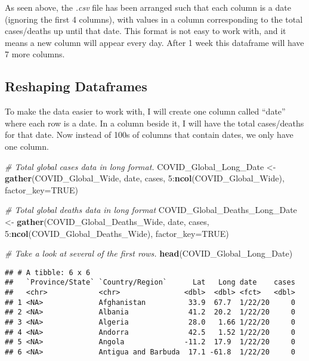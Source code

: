 \documentclass[]{tufte-handout}
\newenvironment{Shaded}{}{}
\newcommand{\CommentTok}[1]{\textcolor[rgb]{0.38,0.63,0.69}{\textit{#1}}}
\newcommand{\DataTypeTok}[1]{\textcolor[rgb]{0.56,0.13,0.00}{#1}}
\newcommand{\DecValTok}[1]{\textcolor[rgb]{0.25,0.63,0.44}{#1}}
\newcommand{\KeywordTok}[1]{\textcolor[rgb]{0.00,0.44,0.13}{\textbf{#1}}}
\newcommand{\NormalTok}[1]{#1}
\newcommand{\OperatorTok}[1]{\textcolor[rgb]{0.40,0.40,0.40}{#1}}
\newcommand{\OtherTok}[1]{\textcolor[rgb]{0.00,0.44,0.13}{#1}}
\newcommand{\StringTok}[1]{\textcolor[rgb]{0.25,0.44,0.63}{#1}}
\begin{document}
As seen above, the \emph{.csv} file has been arranged such that each
column is a date (ignoring the first 4 columns), with values in a column
corresponding to the total cases/deaths up until that date. This format
is not easy to work with, and it means a new column will appear every
day. After 1 week this dataframe will have 7 more columns.

\hypertarget{reshaping-dataframes}{%
\subsection{Reshaping Dataframes}\label{reshaping-dataframes}}

To make the data easier to work with, I will create one column called
``date'' where each row is a date. In a column beside it, I will have
the total cases/deaths for that date. Now instead of 100s of columns
that contain dates, we only have one column.

\begin{Shaded}
\begin{Highlighting}[]
\CommentTok{# Total global cases data in long format.}
\NormalTok{COVID_Global_Long_Date <-}\StringTok{ }\KeywordTok{gather}\NormalTok{(COVID_Global_Wide, date, cases, }\DecValTok{5}\OperatorTok{:}\KeywordTok{ncol}\NormalTok{(COVID_Global_Wide), }\DataTypeTok{factor_key=}\OtherTok{TRUE}\NormalTok{)}

\CommentTok{# Total global deaths data in long format}
\NormalTok{COVID_Global_Deaths_Long_Date <-}\StringTok{ }\KeywordTok{gather}\NormalTok{(COVID_Global_Deaths_Wide, date, cases, }\DecValTok{5}\OperatorTok{:}\KeywordTok{ncol}\NormalTok{(COVID_Global_Deaths_Wide), }\DataTypeTok{factor_key=}\OtherTok{TRUE}\NormalTok{)}

\CommentTok{# Take a look at several of the first rows.}
\KeywordTok{head}\NormalTok{(COVID_Global_Long_Date)}
\end{Highlighting}
\end{Shaded}

\begin{verbatim}
## # A tibble: 6 x 6
##   `Province/State` `Country/Region`      Lat   Long date    cases
##   <chr>            <chr>               <dbl>  <dbl> <fct>   <dbl>
## 1 <NA>             Afghanistan          33.9  67.7  1/22/20     0
## 2 <NA>             Albania              41.2  20.2  1/22/20     0
## 3 <NA>             Algeria              28.0   1.66 1/22/20     0
## 4 <NA>             Andorra              42.5   1.52 1/22/20     0
## 5 <NA>             Angola              -11.2  17.9  1/22/20     0
## 6 <NA>             Antigua and Barbuda  17.1 -61.8  1/22/20     0
\end{verbatim}
\end{document}
